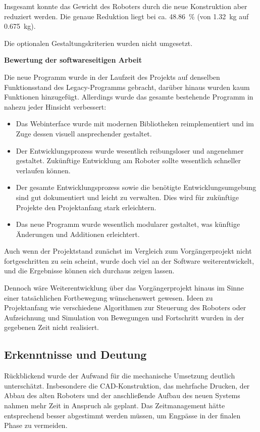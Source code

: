Insgesamt konnte das Gewicht des Roboters durch die neue Konstruktion aber reduziert werden. Die genaue Reduktion liegt bei ca. \qty{48,86}{\percent} (von \qty{1,32}{\kilo\gram} auf \qty{0,675}{\kilo\gram}).

Die optionalen Gestaltungskriterien wurden nicht umgesetzt. 

\pagebreak
\textbf{Bewertung der softwareseitigen Arbeit}

Die neue Programm wurde in der Laufzeit des Projekts auf denselben Funktionsstand des Legacy-Programms gebracht, darüber hinaus wurden kaum Funktionen hinzugefügt. Allerdings wurde das gesamte bestehende Programm in nahezu jeder Hinsicht verbessert:

\begin{itemize}
	\item Das Webinterface wurde mit modernen Bibliotheken reimplementiert und im Zuge dessen visuell ansprechender gestaltet.
	\item Der Entwicklungsprozess wurde wesentlich reibungsloser und angenehmer gestaltet. Zukünftige Entwicklung am Roboter sollte wesentlich schneller verlaufen können.
	\item Der gesamte Entwicklungsprozess sowie die benötigte Entwicklungsumgebung sind gut dokumentiert und leicht zu verwalten. Dies wird für zukünftige Projekte den Projektanfang stark erleichtern.
	\item Das neue Programm wurde wesentlich modularer gestaltet, was künftige Änderungen und Additionen erleichtert.
\end{itemize}

Auch wenn der Projektstand zunächst im Vergleich zum Vorgängerprojekt nicht fortgeschritten zu sein scheint, wurde doch viel an der Software weiterentwickelt, und die Ergebnisse können sich durchaus zeigen lassen.

Dennoch wäre Weiterentwicklung über das Vorgängerprojekt hinaus im Sinne einer tatsächlichen Fortbewegung wünschenswert gewesen. Ideen zu Projektanfang wie verschiedene Algorithmen zur Steuerung des Roboters oder Aufzeichnung und Simulation von Bewegungen und Fortschritt wurden in der gegebenen Zeit nicht realisiert.

\subsection{Erkenntnisse und Deutung}

Rückblickend wurde der Aufwand für die mechanische Umsetzung deutlich unterschätzt. Insbesondere die CAD-Konstruktion, das mehrfache Drucken, der Abbau des alten Roboters und der anschließende Aufbau des neuen Systems nahmen mehr Zeit in Anspruch als geplant. Das Zeitmanagement hätte entsprechend besser abgestimmt werden müssen, um Engpässe in der finalen Phase zu vermeiden.

